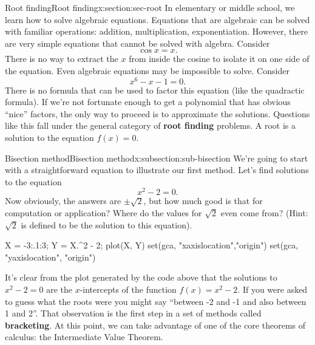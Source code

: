 \documentclass[oneside,10pt,]{article}
\newcommand{\terminology}[1]{\textbf{#1}}
\numberwithin{equation}{section}
\numberwithin{equation}{section}
\begin{document}
\begin{sectionptx}{Root finding}{}{Root finding}{}{}{x:section:sec-root}
In elementary or middle school, we learn how to solve algebraic equations. Equations that are algebraic can be solved with familiar operations: addition, multiplication, exponentiation. However, there are very simple equations that cannot be solved with algebra. Consider%
\begin{equation*}
\cos x = x.
\end{equation*}
There is no way to extract the \(x\) from inside the cosine to isolate it on one side of the equation. Even algebraic equations may be impossible to solve. Consider%
\begin{equation*}
x^6 - x - 1 = 0.
\end{equation*}
There is no formula that can be used to factor this equation (like the quadractic formula). If we're not fortunate enough to get a polynomial that has obvious ``nice'' factors, the only way to proceed is to approximate the solutions. Questions like this fall under the general category of \terminology{root finding} problems. A root is a solution to the equation \(f(x) = 0\).%
%
%
\typeout{************************************************}
\typeout{************************************************}
%
\begin{subsectionptx}{Bisection method}{}{Bisection method}{}{}{x:subsection:sub-bisection}
We're going to start with a straightforward equation to illustrate our first method. Let's find solutions to the equation%
\begin{equation*}
x^2 - 2 = 0.
\end{equation*}
Now obviously, the answers are \(\pm \sqrt{2}\), but how much good is that for computation or application? Where do the values for \(\sqrt{2}\) even come from? (Hint: \(\sqrt{2}\) is defined to be the solution to this equation). \begin{sageinput}
X = -3:.1:3;
Y = X.^2 - 2;
plot(X, Y)
set(gca, "xaxislocation","origin")
set(gca, "yaxislocation", "origin")
\end{sageinput}
 It's clear from the plot generated by the code above that the solutions to \(x^2 - 2 = 0\) are the \(x\)-intercepts of the function \(f(x) = x^2 - 2\). If you were asked to guess what the roots were you might say ``between -2 and -1 and also between 1 and 2''. That observation is the first step in a set of methods called \terminology{bracketing}. At this point, we can take advantage of one of the core theorems of calculus: the Intermediate Value Theorem.%

\end{subsectionptx}
\end{sectionptx}
\end{document}
